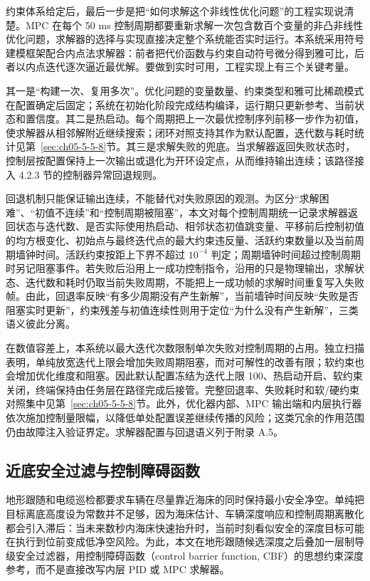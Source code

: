 约束体系给定后，最后一步是把``如何求解这个非线性优化问题''的工程实现说清楚。MPC 在每个 50 ms 控制周期都要重新求解一次包含数百个变量的非凸非线性优化问题，求解器的选择与实现直接决定整个系统能否实时运行。本系统采用符号建模框架配合内点法求解器\cite{andersson2019casadi,waechter2006ipopt}：前者把代价函数与约束自动符号微分得到雅可比，后者以内点迭代逐次逼近最优解。要做到实时可用，工程实现上有三个关键考量。

其一是``构建一次、复用多次''。优化问题的变量数量、约束类型和雅可比稀疏模式在配置确定后固定；系统在初始化阶段完成结构编译，运行期只更新参考、当前状态和置信度。其二是热启动。每个周期把上一次最优控制序列前移一步作为初值，使求解器从相邻解附近继续搜索；闭环对照支持其作为默认配置，迭代数与耗时统计见第~\ref{sec:ch05-5-5-8}节。其三是求解失败的兜底。当求解器返回失败状态时，控制层按配置保持上一次输出或退化为开环设定点，从而维持输出连续；该路径接入 4.2.3 节的控制器异常回退规则。

回退机制只能保证输出连续，不能替代对失败原因的观测。为区分``求解困难''、``初值不连续''和``控制周期被阻塞''，本文对每个控制周期统一记录求解器返回状态与迭代数、是否实际使用热启动、相邻状态初值跳变量、平移前后控制初值的均方根变化、初始点与最终迭代点的最大约束违反量、活跃约束数量以及当前周期墙钟时间。活跃约束按距上下界不超过 \(10^{-4}\) 判定；周期墙钟时间超过控制周期时另记阻塞事件。若失败后沿用上一成功控制指令，沿用的只是物理输出，求解状态、迭代数和耗时仍取当前失败周期，不能把上一成功帧的求解时间重复写入失败帧。由此，回退率反映``有多少周期没有产生新解''，当前墙钟时间反映``失败是否阻塞实时更新''，约束残差与初值连续性则用于定位``为什么没有产生新解''，三类语义彼此分离。

在数值容差上，本系统以最大迭代次数限制单次失败对控制周期的占用。独立扫描表明，单纯放宽迭代上限会增加失败周期阻塞，而对可解性的改善有限；软约束也会增加优化维度和阻塞。因此默认配置冻结为迭代上限 100、热启动开启、软约束关闭，终端保持由任务层在路径完成后接管。完整回退率、失败耗时和软/硬约束对照集中见第~\ref{sec:ch05-5-5-8}节。此外，优化器内部、MPC 输出端和内层执行器依次施加控制量限幅，以降低单处配置误差继续传播的风险；这类冗余的作用范围仍由故障注入验证界定。求解器配置与回退语义列于附录 A.5。

\subsection{近底安全过滤与控制障碍函数}\label{sec:ch04-4-4-7}

地形跟随和电缆巡检都要求车辆在尽量靠近海床的同时保持最小安全净空。单纯把目标离底高度设为常数并不足够，因为海床估计、车辆深度响应和控制周期离散化都会引入滞后：当未来数秒内海床快速抬升时，当前时刻看似安全的深度目标可能在执行到位前变成低净空风险。为此，本文在地形跟随候选深度之后叠加一层制导级安全过滤器，用控制障碍函数（control barrier function, CBF）的思想约束深度参考，而不是直接改写内层 PID 或 MPC 求解器。

